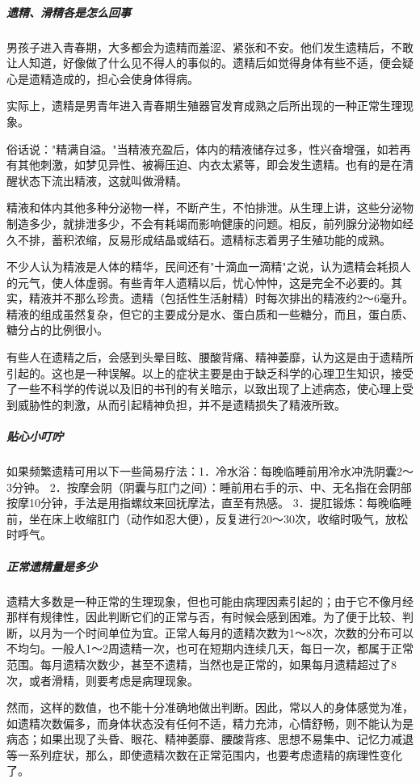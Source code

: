 \subparagraph{遗精、滑精各是怎么回事}

男孩子进入青春期，大多都会为遗精而羞涩、紧张和不安。他们发生遗精后，不敢让人知道，好像做了什么见不得人的事似的。遗精后如觉得身体有些不适，便会疑心是遗精造成的，担心会使身体得病。

实际上，遗精是男青年进入青春期生殖器官发育成熟之后所出现的一种正常生理现象。

俗话说："精满自溢。"当精液充盈后，体内的精液储存过多，性兴奋增强，如若再有其他刺激，如梦见异性、被褥压迫、内衣太紧等，即会发生遗精。也有的是在清醒状态下流出精液，这就叫做滑精。

精液和体内其他多种分泌物一样，不断产生，不怕排泄。从生理上讲，这些分泌物制造多少，就排泄多少，不会有耗竭而影响健康的问题。相反，前列腺分泌物如经久不排，蓄积浓缩，反易形成结晶或结石。遗精标志着男子生殖功能的成熟。

不少人认为精液是人体的精华，民间还有"十滴血一滴精"之说，认为遗精会耗损人的元气，使人体虚弱。有些青年人遗精以后，忧心忡忡，这是完全不必要的。其实，精液并不那么珍贵。遗精（包括性生活射精）时每次排出的精液约2～6毫升。精液的组成虽然复杂，但它的主要成分是水、蛋白质和一些糖分，而且，蛋白质、糖分占的比例很小。

有些人在遗精之后，会感到头晕目眩、腰酸背痛、精神萎靡，认为这是由于遗精所引起的。这也是一种误解。以上的症状主要是由于缺乏科学的心理卫生知识，接受了一些不科学的传说以及旧的书刊的有关暗示，以致出现了上述病态，使心理上受到威胁性的刺激，从而引起精神负担，并不是遗精损失了精液所致。

\subparagraph{贴心小叮咛}

如果频繁遗精可用以下一些简易疗法：1．冷水浴：每晚临睡前用冷水冲洗阴囊2～3分钟。
2．按摩会阴（阴囊与肛门之间）：睡前用右手的示、中、无名指在会阴部按摩10分钟，手法是用指螺纹来回抚摩法，直至有热感。
3．提肛锻炼：每晚临睡前，坐在床上收缩肛门（动作如忍大便），反复进行20～30次，收缩时吸气，放松时呼气。

\subparagraph{正常遗精量是多少}

遗精大多数是一种正常的生理现象，但也可能由病理因素引起的；由于它不像月经那样有规律性，因此判断它们的正常与否，有时候会感到困难。为了便于比较、判断，以月为一个时间单位为宜。正常人每月的遗精次数为1～8次，次数的分布可以不均匀。一般人1～2周遗精一次，也可在短期内连续几天，每日一次，都属于正常范围。每月遗精次数少，甚至不遗精，当然也是正常的，如果每月遗精超过了8次，或者滑精，则要考虑是病理现象。

然而，这样的数值，也不能十分准确地做出判断。因此，常以人的身体感觉为准，如遗精次数偏多，而身体状态没有任何不适，精力充沛，心情舒畅，则不能认为是病态；如果出现了头昏、眼花、精神萎靡、腰酸背疼、思想不易集中、记忆力减退等一系列症状，那么，即使遗精次数在正常范围内，也要考虑遗精的病理性变化了。

